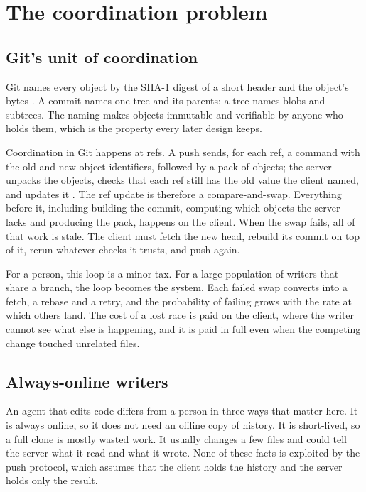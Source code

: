 \documentclass[11pt,letterpaper]{article}
\theoremstyle{definition}
\theoremstyle{remark}
\begin{document}
\section{The coordination problem}
\label{sec:tlsc:problem}

\subsection{Git's unit of coordination}

Git names every object by the SHA-1 digest of a short header and the object's bytes \cite{gitobjects}. A commit names one tree and its parents; a tree names blobs and subtrees. The naming makes objects immutable and verifiable by anyone who holds them, which is the property every later design keeps.

Coordination in Git happens at refs. A push sends, for each ref, a command with the old and new object identifiers, followed by a pack of objects; the server unpacks the objects, checks that each ref still has the old value the client named, and updates it \cite{gitprotocol}. The ref update is therefore a compare-and-swap. Everything before it, including building the commit, computing which objects the server lacks and producing the pack, happens on the client. When the swap fails, all of that work is stale. The client must fetch the new head, rebuild its commit on top of it, rerun whatever checks it trusts, and push again.

For a person, this loop is a minor tax. For a large population of writers that share a branch, the loop becomes the system. Each failed swap converts into a fetch, a rebase and a retry, and the probability of failing grows with the rate at which others land. The cost of a lost race is paid on the client, where the writer cannot see what else is happening, and it is paid in full even when the competing change touched unrelated files.

\subsection{Always-online writers}

An agent that edits code differs from a person in three ways that matter here. It is always online, so it does not need an offline copy of history. It is short-lived, so a full clone is mostly wasted work. It usually changes a few files and could tell the server what it read and what it wrote. None of these facts is exploited by the push protocol, which assumes that the client holds the history and the server holds only the result.
\end{document}
